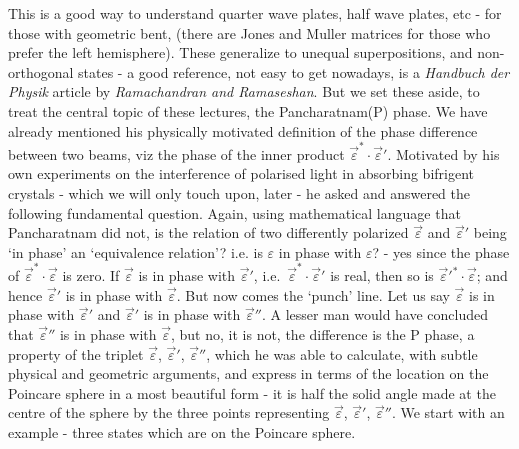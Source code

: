 This is a good way to understand quarter wave plates, half wave plates,
etc - for those with geometric bent, (there are Jones and Muller matrices for
those who prefer the left hemisphere). These generalize to unequal superpositions,
and non-orthogonal states - a good reference, not easy to get nowadays, is a
\textit{Handbuch der Physik} article by \textit{Ramachandran and Ramaseshan}. But we set
these aside, to treat the central topic of these lectures, the Pancharatnam(P)
phase. We have already mentioned his physically motivated definition of the
phase difference between two beams, viz the phase of the inner product $\overrightarrow{\varepsilon}^{\ast} \cdot \overrightarrow{\varepsilon}'$. 
Motivated by his own experiments on the interference of polarised light in absorbing bifrigent crystals - which we will only touch upon, later - he asked and
answered the following fundamental question. Again, using mathematical language that Pancharatnam did not, is the relation of two differently polarized
$\overrightarrow{\varepsilon}$ and $\overrightarrow{\varepsilon}'$ being `in phase' an `equivalence relation'? i.e. is $\varepsilon$ in phase
with $\varepsilon$? - yes since the phase of $\overrightarrow{\varepsilon}^{\ast} \cdot \overrightarrow{\varepsilon}$ is zero. 
If $\overrightarrow{\varepsilon}$ is in phase with $\overrightarrow{\varepsilon}'$, 
i.e.\ $\overrightarrow{\varepsilon}^{\ast} \cdot \overrightarrow{\varepsilon}'$ is real, 
then so is $\overrightarrow{\varepsilon}'^{\ast} \cdot \overrightarrow{\varepsilon}$; 
and hence $\overrightarrow{\varepsilon}'$ is in phase with $\overrightarrow{\varepsilon}$. 
But now comes the `punch' line. Let us say $\overrightarrow{\varepsilon}$ is in phase 
with $\overrightarrow{\varepsilon}'$ and $\overrightarrow{\varepsilon}'$ is in phase with $\overrightarrow{\varepsilon}''$. 
A lesser man would have concluded that $\overrightarrow{\varepsilon}''$ is in phase with $\overrightarrow{\varepsilon}$, 
but no, it is not, the difference is the P phase, a property of the triplet 
$\overrightarrow{\varepsilon}$, $\overrightarrow{\varepsilon}'$, $\overrightarrow{\varepsilon}''$, which he 
was able to calculate, with subtle physical and geometric arguments, and express in
terms of the location on the Poincare sphere in a most beautiful form - it is half
the solid angle made at the centre of the sphere by the three points representing
$\overrightarrow{\varepsilon}$, $\overrightarrow{\varepsilon}'$, $\overrightarrow{\varepsilon}''$. We start with an example - three states which are on the Poincare sphere.
\bigskip

